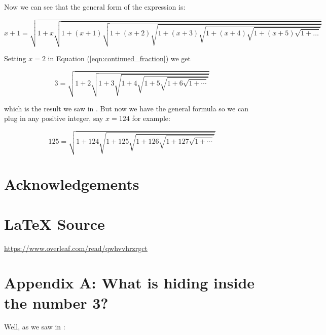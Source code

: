 \documentclass{article}
\theoremstyle{definition}
\begin{document}
\bigskip
\noindent
Now we can see that the general form of the expression is:

\bigskip
\begin{equation}
x+1 = \sqrt{1+x\sqrt{1+(x+1)\sqrt{1+(x+2)\sqrt{1+(x+3)\sqrt{1+(x+4)\sqrt{1 + (x+5)\sqrt{1+\hdots}}}}}}}
\label{eqn:continued_fraction}
\end{equation}

\bigskip
\noindent
Setting $x = 2$ in Equation (\ref{eqn:continued_fraction}) we get

\bigskip
\begin{equation*}
3 = \sqrt{1 + 2 \sqrt{1 + 3 \sqrt{1 + 4  \sqrt{1 + 5 \sqrt{1 + 6 \sqrt{1 + \cdots}}}}}}
\end{equation*}

\bigskip
\noindent
which is the result we saw in \cite{notes:what_is_hiding_inside_the_number_3}.
But now we have the general formula so we can plug in any positive integer, 
say $x = 124$ for example:

\bigskip
\begin{equation*}
125 = \sqrt{1 + 124 \sqrt{1 + 125 \sqrt{1 + 126  \sqrt{1 + 127 \sqrt{1 + \cdots}}}}}
\end{equation*}
%
%
%
\section*{Acknowledgements}
%
%
\section*{\LaTeX \hspace{0.10 mm} Source}
\url{https://www.overleaf.com/read/qwhvvhrzrgct}
%
%
%


%
%
%
\section*{Appendix A: What is hiding inside the number 3?}
\noindent
 Well, as we saw in \cite{notes:what_is_hiding_inside_the_number_3}:
\end{document}
